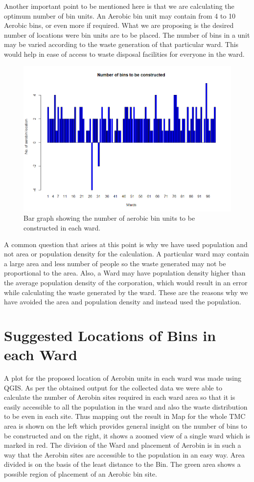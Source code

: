 \documentclass[12pt,a4paper]{  report}
\begin{document}
Another important point to be mentioned here is that we are calculating the optimum number of bin units. An Aerobic bin unit may contain from 4 to 10 Aerobic bins, or even more if required. What we are proposing is the desired number of locations were bin units are to be placed. The number of bins in a unit may be varied according to the waste generation of that particular ward. This would help in ease of access to waste disposal facilities for everyone in the ward.

\begin{figure}
	\centering
	\includegraphics[width=0.7\linewidth]{construc}
	\caption{Bar graph showing the number of aerobic bin units to be constructed in each ward.}
	\label{fig:construc}
\end{figure}

A common question that arises at this point is why we have used population and not area or population density for the calculation. A particular ward may contain a large area and less number of people so the waste generated may not be proportional to the area. Also, a Ward may have population density higher than the average population density of the corporation, which would result in an error while calculating the waste generated by the ward. These are the reasons why we have avoided the area and population density and instead used the population.

\section{Suggested Locations of Bins in each Ward}
A plot for the proposed location of Aerobin units in each ward was made using QGIS. As per the obtained output for the collected data we were able to calculate the number of Aerobin sites required in each ward area so that it is easily accessible to all the population in the ward and also the waste distribution to be even in each site. Thus mapping out the result in Map for the whole TMC area is shown on the left which provides general insight on the number of bins to be constructed and on the right, it shows a zoomed view of a single ward which is marked in red. The division of the Ward and placement of Aerobin is in such a way that the Aerobin sites are accessible to the population in an easy way. Area divided is on the basis of the least distance to the Bin. The green area shows a possible region of placement of an Aerobic bin site.
\end{document}
